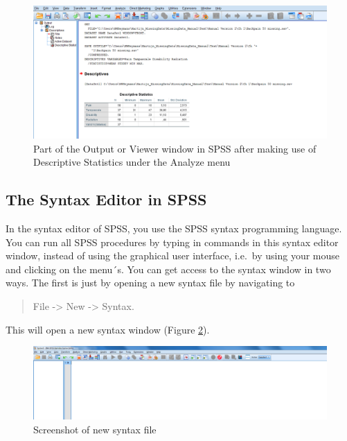\documentclass[]{book}
\begin{document}
\begin{figure}

{\centering \includegraphics[width=0.95\linewidth]{images/fig1.5} 

}

\caption{Part of the Output or Viewer window in SPSS after making use of Descriptive Statistics under the Analyze menu}\label{fig:fig5}
\end{figure}

\subsection{The Syntax Editor in SPSS}\label{the-syntax-editor-in-spss}

In the syntax editor of SPSS, you use the SPSS syntax programming
language. You can run all SPSS procedures by typing in commands in this
syntax editor window, instead of using the graphical user interface,
i.e.~by using your mouse and clicking on the menu´s. You can get access
to the syntax window in two ways. The first is just by opening a new
syntax file by navigating to

\begin{quote}
File -\textgreater{} New -\textgreater{} Syntax.
\end{quote}

This will open a new syntax window (Figure \ref{fig:fig6}).

\begin{figure}

{\centering \includegraphics[width=0.95\linewidth]{images/fig1.6} 

}

\caption{Screenshot of new syntax file}\label{fig:fig6}
\end{figure}
\end{document}
